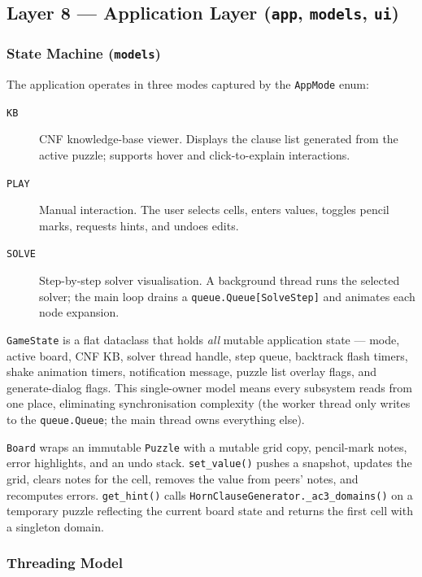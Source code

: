\subsection{Layer 8 — Application Layer (\texttt{app}, \texttt{models}, \texttt{ui})}
\label{sec:layer_app}

\subsubsection{State Machine (\texttt{models})}

The application operates in three modes captured by the \texttt{AppMode} enum:

\begin{description}
  \item[\texttt{KB}] CNF knowledge-base viewer.
    Displays the clause list generated from the active puzzle; supports hover
    and click-to-explain interactions.
  \item[\texttt{PLAY}] Manual interaction.
    The user selects cells, enters values, toggles pencil marks, requests hints,
    and undoes edits.
  \item[\texttt{SOLVE}] Step-by-step solver visualisation.
    A background thread runs the selected solver; the main loop drains a
    \texttt{queue.Queue[SolveStep]} and animates each node expansion.
\end{description}

\texttt{GameState} is a flat dataclass that holds \emph{all} mutable
application state — mode, active board, CNF KB, solver thread handle,
step queue, backtrack flash timers, shake animation timers, notification
message, puzzle list overlay flags, and generate-dialog flags.
This single-owner model means every subsystem reads from one place, eliminating
synchronisation complexity (the worker thread only writes to the
\texttt{queue.Queue}; the main thread owns everything else).

\texttt{Board} wraps an immutable \texttt{Puzzle} with a mutable grid copy,
pencil-mark notes, error highlights, and an undo stack.
\texttt{set\_value()} pushes a snapshot, updates the grid, clears notes for
the cell, removes the value from peers' notes, and recomputes errors.
\texttt{get\_hint()} calls \texttt{HornClauseGenerator.\_ac3\_domains()} on
a temporary puzzle reflecting the current board state and returns the first
cell with a singleton domain.

\subsubsection{Threading Model}

